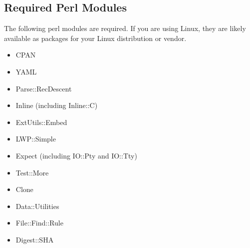 \documentclass[12pt]{article}
\begin{document}
\subsection*{Required Perl Modules}

The following perl modules are required.  If you are using Linux, they
are likely available as packages for your Linux distribution or vendor.

\begin{itemize}
\item CPAN
\item YAML
\item Parse::RecDescent
\item Inline (including Inline::C)
\item ExtUtils::Embed
\item LWP::Simple
\item Expect (including IO::Pty and IO::Tty)
\item Test::More
\item Clone
\item Data::Utilities
\item File::Find::Rule
\item Digest::SHA
\end{itemize}
\end{document}
